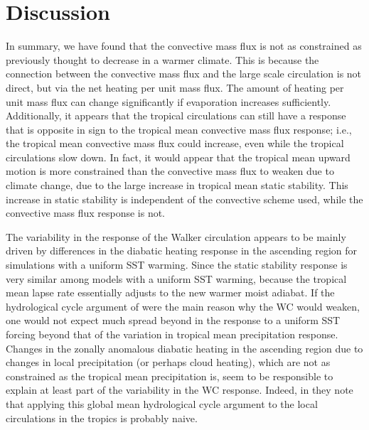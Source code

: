 \documentclass[letterpaper,12pt,titlepage,oneside,final]{book}
\begin{document}
\section{Discussion}
In summary, we have found that the convective mass flux is not as constrained as previously thought to decrease in a warmer climate. This is because the connection between the convective mass flux and the large scale circulation is not direct, but via the net heating per unit mass flux. The amount of heating per unit mass flux can change significantly if evaporation increases sufficiently. Additionally, it appears that the tropical circulations can still have a response that is opposite in sign to the tropical mean convective mass flux response; i.e., the tropical mean convective mass flux could increase, even while the tropical circulations slow down. In fact, it would appear that the tropical mean upward motion is more constrained than the convective mass flux to weaken due to climate change, due to the large increase in tropical mean static stability. This increase in static stability is independent of the convective scheme used, while the convective mass flux response is not.

The variability in the response of the Walker circulation appears to be mainly driven by differences in the diabatic heating response in the ascending region for simulations with a uniform SST warming. Since the static stability response is very similar among models with a uniform SST warming, because the tropical mean lapse rate essentially adjusts to the new warmer moist adiabat. If the hydrological cycle argument of \citep{held_robust_2006} were the main reason why the WC would weaken, one would not expect much spread beyond in the response to a uniform SST forcing beyond that of the variation in tropical mean precipitation response. Changes in the zonally anomalous diabatic heating in the ascending region due to changes in local precipitation (or perhaps cloud heating), which are not as constrained as the tropical mean precipitation is, seem to be responsible to explain at least part of the variability in the WC response. Indeed, in \citep{schneider_water_2010} they note that applying this global mean hydrological cycle argument to the local circulations in the tropics is probably naive.
\end{document}
